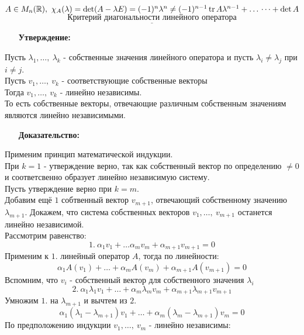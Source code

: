 \documentclass[12pt, letterpaper, twoside]{article}
\newcommand{\tr}{\operatorname{tr}}
\newcommand{\mb}[1]{\mathbb{#1}}
\begin{document}
         $A\in M_n(\mb{R}),\ \chi_A(\lambda) = \det(A - \lambda E) = (-1)^n \lambda^n \neq (-1)^{n - 1}\tr A \lambda^{n - 1} + \dots\\
         \dots + \det A$
         \[\underline{\text{Критерий диагональности линейного оператора}}\]
         \begin{enumerate}
            \item[\textbf{Утверждение:}]
         \end{enumerate}
         Пусть $\lambda_1,\dots,\ \lambda_k$ - собственные значения линейного оператора и пусть $\lambda_i \neq \lambda_j$ при $i\neq j$.\\
         Пусть $v_1,\dots,\ v_k$ - соответствующие собственные векторы\\
         Тогда $v_1,\dots,\ v_k$ - линейно независимы.\\
         То есть собственные векторы, отвечающие различным собственным значениям являются линейно независимыми.
         \begin{enumerate}
            \item[\textbf{Доказательство:}]
         \end{enumerate}
         Применим принцип математической индукции.\\
         При $k = 1$ - утверждение верно, так как собственный вектор по определению $\neq 0$ и соответсвенно образует линейно независимую систему.\\
         Пусть утверждение верно при $k = m$.\\
         Добавим ещё $1$ собтвенный вектор $v_{m + 1}$, отвечающий собственному значению $\lambda_{m + 1}$. Докажем, что система собственных векторов $v_1,\dots,\ v_{m + 1}$ останется линейно независимой.\\
         Рассмотрим равенство:\\
         \[1.\ \alpha_1 v_1 + \dots \alpha_m v_m + \alpha_{m +  1}v_{m + 1}= 0\]
         Применим к $1.$ линейный оператор $A$, тогда по линейности:\\
         \[\alpha_1 A(v_1) + \dots + \alpha_m A(v_m) + \alpha_{m + 1} A(v_{m + 1}) = 0\]
         Вспомним, что $v_i$ - собственный вектор для собственного значения $\lambda_i$
         \[2.\ \alpha_1 \lambda_1 v_1 + \dots + \alpha_m \lambda_m v_m + \alpha_{m + 1} \lambda_{m + 1} v_{m + 1}\]
         Умножим $1.$ на $\lambda_{m + 1}$ и вычтем из $2.$
         \[\alpha_1(\lambda_1 - \lambda_{m + 1})v_1 + \dots + \alpha_m(\lambda_m - \lambda_{m + 1})v_m = 0\]
         По предположению индукции $v_1,\dots,\ v_m$ - линейно независимы:
\end{document}
